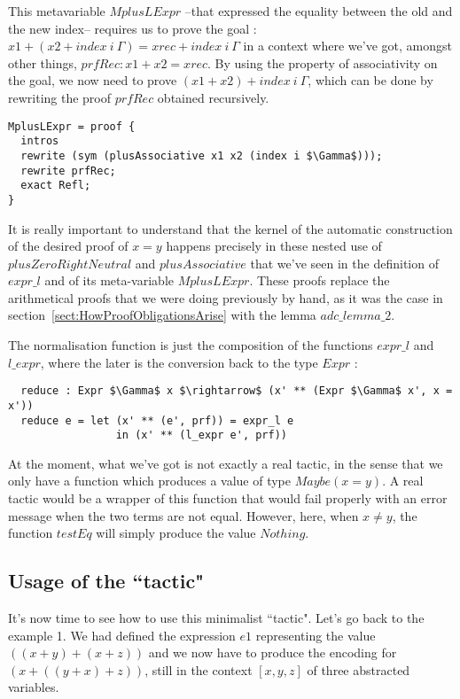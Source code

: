 This metavariable $MplusLExpr$ --that expressed the equality between the old and the new index-- requires us to prove the goal : $x1 + (x2 + index\ i\ \Gamma) = xrec + index\ i\ \Gamma$ in a context where we've got, amongst other things, $prfRec : x1 + x2 = xrec$.
By using the property of associativity on the goal, we now need to prove $(x1 + x2) + index\ i\ \Gamma$, which can be done by rewriting the proof $prfRec$ obtained recursively.


\begin{lstlisting}
MplusLExpr = proof {
  intros
  rewrite (sym (plusAssociative x1 x2 (index i $\Gamma$))); 
  rewrite prfRec; 
  exact Refl;
}
\end{lstlisting}


It is really important to understand that the kernel of the automatic construction of the desired proof of $x=y$ happens precisely in these nested use of $plusZeroRightNeutral$ and $plusAssociative$ that we've seen in the definition of $expr\_l$ and of its meta-variable $MplusLExpr$. These proofs replace the arithmetical proofs that we were doing previously by hand, as it was the case in section~\ref{sect:HowProofObligationsArise} with the lemma $adc\_lemma\_2$.

The normalisation function is just the composition of the functions $expr\_l$ and $l\_expr$, where the later is the conversion back to the type $Expr$ :

\begin{lstlisting}
  reduce : Expr $\Gamma$ x $\rightarrow$ (x' ** (Expr $\Gamma$ x', x = x'))
  reduce e = let (x' ** (e', prf)) = expr_l e 
                 in (x' ** (l_expr e', prf))
\end{lstlisting}

At the moment, what we've got is not exactly a real tactic, in the sense that we only have a function which produces a value of type $Maybe (x = y)$. A real tactic would be a wrapper of this function that would fail properly with an error message when the two terms are not equal. However, here, when $x\ne y$, the function $testEq$ will simply produce the value $Nothing$. \\


	\subsection{Usage of the ``tactic"}

It's now time to see how to use this minimalist ``tactic".
Let's go back to the example 1. We had defined the expression $e1$ representing the value $((x + y) + (x + z))$ and we now have to produce the encoding for $(x + ((y + x) + z))$, still in the context $[x, y, z]$ of three abstracted variables.


